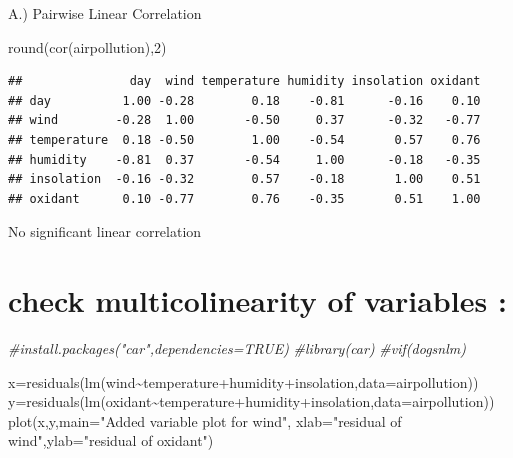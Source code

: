 \documentclass[
]{article}
\newenvironment{Shaded}{\begin{snugshade}}{\end{snugshade}}
\newcommand{\AttributeTok}[1]{\textcolor[rgb]{0.77,0.63,0.00}{#1}}
\newcommand{\CommentTok}[1]{\textcolor[rgb]{0.56,0.35,0.01}{\textit{#1}}}
\newcommand{\DecValTok}[1]{\textcolor[rgb]{0.00,0.00,0.81}{#1}}
\newcommand{\FunctionTok}[1]{\textcolor[rgb]{0.00,0.00,0.00}{#1}}
\newcommand{\NormalTok}[1]{#1}
\newcommand{\OtherTok}[1]{\textcolor[rgb]{0.56,0.35,0.01}{#1}}
\newcommand{\SpecialCharTok}[1]{\textcolor[rgb]{0.00,0.00,0.00}{#1}}
\newcommand{\StringTok}[1]{\textcolor[rgb]{0.31,0.60,0.02}{#1}}
\begin{document}
A.) Pairwise Linear Correlation

\begin{Shaded}
\begin{Highlighting}[]
\FunctionTok{round}\NormalTok{(}\FunctionTok{cor}\NormalTok{(airpollution),}\DecValTok{2}\NormalTok{)}
\end{Highlighting}
\end{Shaded}

\begin{verbatim}
##               day  wind temperature humidity insolation oxidant
## day          1.00 -0.28        0.18    -0.81      -0.16    0.10
## wind        -0.28  1.00       -0.50     0.37      -0.32   -0.77
## temperature  0.18 -0.50        1.00    -0.54       0.57    0.76
## humidity    -0.81  0.37       -0.54     1.00      -0.18   -0.35
## insolation  -0.16 -0.32        0.57    -0.18       1.00    0.51
## oxidant      0.10 -0.77        0.76    -0.35       0.51    1.00
\end{verbatim}

No significant linear correlation

\hypertarget{check-multicolinearity-of-variables}{%
\section{check multicolinearity of variables
:}\label{check-multicolinearity-of-variables}}

\begin{Shaded}
\begin{Highlighting}[]
\CommentTok{\#install.packages("car",dependencies=TRUE)}
\CommentTok{\#library(car)}
\CommentTok{\#vif(dogsnlm)}
\end{Highlighting}
\end{Shaded}

\begin{Shaded}
\begin{Highlighting}[]
\NormalTok{x}\OtherTok{=}\FunctionTok{residuals}\NormalTok{(}\FunctionTok{lm}\NormalTok{(wind}\SpecialCharTok{\textasciitilde{}}\NormalTok{temperature}\SpecialCharTok{+}\NormalTok{humidity}\SpecialCharTok{+}\NormalTok{insolation,}\AttributeTok{data=}\NormalTok{airpollution))}
\NormalTok{y}\OtherTok{=}\FunctionTok{residuals}\NormalTok{(}\FunctionTok{lm}\NormalTok{(oxidant}\SpecialCharTok{\textasciitilde{}}\NormalTok{temperature}\SpecialCharTok{+}\NormalTok{humidity}\SpecialCharTok{+}\NormalTok{insolation,}\AttributeTok{data=}\NormalTok{airpollution))}
\FunctionTok{plot}\NormalTok{(x,y,}\AttributeTok{main=}\StringTok{"Added variable plot for wind"}\NormalTok{, }\AttributeTok{xlab=}\StringTok{"residual of wind"}\NormalTok{,}\AttributeTok{ylab=}\StringTok{"residual of oxidant"}\NormalTok{)}
\end{Highlighting}
\end{Shaded}
\end{document}
